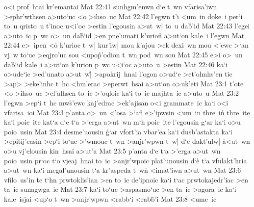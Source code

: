o<i
prof~htai
kr'emantai\bibvsend
\vs Mat 22:41
sunhgm'enwn
d`e
t~wn
vfarisa'iwn
>ephr'wthsen
a>uto`uc
<o
>ihso~uc\bibvsend
\vs Mat 22:42
l'egwn
t'i
<um~in
doke~i
per`i
to~u
qristo~u
t'inoc
u<i'oc
>estin
l'egousin
a>ut~w|
to~u
da\r{b}'id\bibvsend
{}
\vs Mat 22:43
l'egei
a>uto~ic
p~wc
o>~un
da\r{b}`id
>en
pne'umati
k'urion\r{}
a>ut`on
kale~i
l'egwn\bibvsend
\vs Mat 22:44
e>~ipen
<o\r{}
k'urioc
t~w|
kur'iw|
mou
k'ajou
>ek
dexi~wn
mou
<'ewc
>`an
vj~w
to`uc
>eqjro'uc
sou
<upo\r{p}'odion
t~wn
pod~wn
sou\bibvsend
\vs Mat 22:45
e>i
o>~un
da\r{b}`id
kale~i
a>ut`on
k'urion
p~wc
u<i`oc
a>uto~u
>estin\bibvsend
\vs Mat 22:46
ka`i
o>ude`ic
>ed'unato
a>ut~w|\r{}
>apokrij~hnai
l'ogon
o>ud`e
>et'olmhs'en
tic
>ap>
>eke'inhc
t~hc
<hm'erac
>eperwt~hsai
a>ut`on
o>uk'eti\bibvsend
\vs Mat 23:1
t'ote
<o
>ihso~uc
>el'alhsen
to~ic
>'oqloic
ka`i
to~ic
majhta~ic
a>uto~u\bibvsend
\vs Mat 23:2
l'egwn
>ep`i
t~hc
mw\r{s}'ewc
kaj'edrac
>ek'ajisan
o<i
grammate~ic
ka`i
o<i
vfarisa~ioi\bibvsend
\vs Mat 23:3
p'anta
o>~un
<'osa
>`a\r{n}
e>'ipwsin
<um~in
thre~in\r{}
thre~ite
ka`i
poie~ite
kat`a
d`e
t`a
>'erga
a>ut~wn
m`h
poie~ite
l'egousin
g`ar
ka`i
o>u
poio~usin\bibvsend
\vs Mat 23:4
desme'uousin
\r{g}`ar
vfort'ia
vbar'ea
ka`i
dusb'astakta
ka`i
>epitij'easin
>ep`i
to`uc
>'wmouc
t~wn
>anjr'wpwn
t~w|\r{}
d`e
dakt'ulw|
\r{a}<ut~wn
o>u
vj'elousin
kin~hsai
a>ut'a\bibvsend
\vs Mat 23:5
p'anta
d`e
t`a
>'erga
a>ut~wn
poio~usin
pr`oc
t`o
vjeaj~hnai
to~ic
>anjr'wpoic
plat'unousin
d`e\r{}
t`a
vfulakt'hria
a>ut~wn
ka`i
megal'unousin
t`a
kr'aspeda
t~wn\r{}
<imat'iwn
a>ut~wn\bibvsend
\vs Mat 23:6
vfilo~us'in
\r{t}e
t`hn
prwtoklis'ian
>en
to~ic
de'ipnoic
ka`i
t`ac
prwtokajedr'iac
>en
ta~ic
sunagwga~ic\bibvsend
\vs Mat 23:7
ka`i
to`uc
>aspasmo`uc
>en
ta~ic
>agora~ic
ka`i
kale~isjai
<up`o
t~wn
>anjr'wpwn
<rabb`i
<rab\r{b}'i\bibvsend
{}
\vs Mat 23:8
<ume~ic
